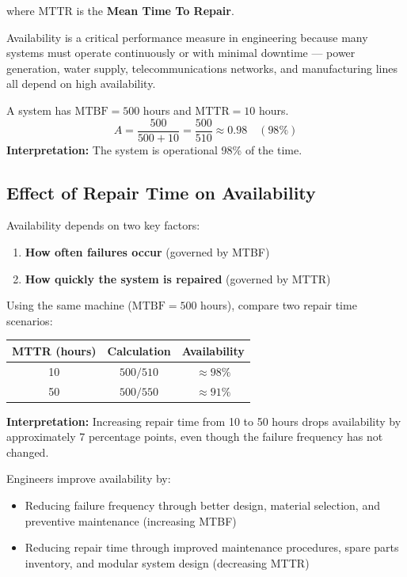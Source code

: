 \documentclass[12pt,a4paper]{article}
\begin{document}
where $\text{MTTR}$ is the \textbf{Mean Time To Repair}.

Availability is a critical performance measure in engineering because many systems must operate continuously or with minimal downtime --- power generation, water supply, telecommunications networks, and manufacturing lines all depend on high availability.

\begin{example}
A system has $\text{MTBF} = 500$ hours and $\text{MTTR} = 10$ hours.
\[
A = \frac{500}{500 + 10} = \frac{500}{510} \approx 0.98 \quad (98\%)
\]
\textbf{Interpretation:} The system is operational 98\% of the time.
\end{example}

\subsection{Effect of Repair Time on Availability}

Availability depends on two key factors:
\begin{enumerate}
    \item \textbf{How often failures occur} (governed by MTBF)
    \item \textbf{How quickly the system is repaired} (governed by MTTR)
\end{enumerate}

\begin{example}
Using the same machine ($\text{MTBF} = 500$ hours), compare two repair time scenarios:

\begin{center}
\renewcommand{\arraystretch}{1.4}
\begin{tabular}{|c|c|c|}
\hline
\textbf{MTTR (hours)} & \textbf{Calculation} & \textbf{Availability} \\
\hline
10 & $500 / 510$ & $\approx 98\%$ \\
50 & $500 / 550$ & $\approx 91\%$ \\
\hline
\end{tabular}
\end{center}

\textbf{Interpretation:} Increasing repair time from 10 to 50 hours drops availability by approximately 7 percentage points, even though the failure frequency has not changed.
\end{example}

Engineers improve availability by:
\begin{itemize}
    \item Reducing failure frequency through better design, material selection, and preventive maintenance (increasing MTBF)
    \item Reducing repair time through improved maintenance procedures, spare parts inventory, and modular system design (decreasing MTTR)
\end{itemize}
\end{document}
